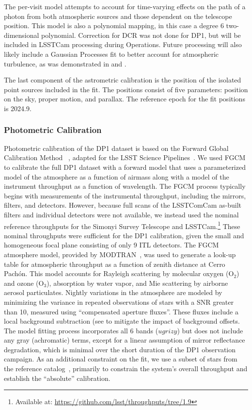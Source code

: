 The per-visit model attempts to account for time-varying effects on the path of a photon from both atmospheric sources and those dependent on the telescope position.
This model is also a polynomial mapping, in this case a degree 6 two-dimensional polynomial.
Correction for \gls{DCR} was not done for \gls{DP1}, but will be included in LSSTCam processing during Operations.
Future processing will also likely include a Gaussian Processes fit to better account for atmospheric turbulence, as was demonstrated in \citet{Fortino2021} and \citet{Leget2021}.

The last component of the astrometric \gls{calibration} is the position of the isolated point sources included in the fit.
The positions consist of five parameters: position on the sky, proper motion, and parallax.
The reference \gls{epoch} for the fit positions is 2024.9.

\subsubsection{Photometric Calibration}
\label{photometric_calibration}
Photometric \gls{calibration} of the DP1 dataset is based on the Forward Global Calibration Method
~\citep[FGCM][]{2018AJ....155...41B}, adapted for the LSST Science Pipelines~\citep{2022PASJ...74..247A, SITCOMTN-086}.
We used \gls{FGCM} to calibrate the full DP1 dataset with a forward model that uses a parameterized model of the atmosphere as a function of airmass along with a model of the instrument throughput as a function of wavelength.
The \gls{FGCM} process typically begins with measurements of the instrumental throughput, including the mirrors, filters, and detectors.
However, because full scans of the \gls{LSSTComCam} as-built filters and individual detectors were not available, we instead used the nominal reference throughputs for the Simonyi Survey Telescope and LSSTCam.\footnote{Available at: \url{https://github.com/lsst/throughputs/tree/1.9}}
These nominal throughputs were sufficient for the DP1 calibration, given the small and homogeneous focal plane consisting of only 9 \gls{ITL} detectors.
The FGCM atmosphere model, provided by MODTRAN~\citep{1999SPIE.3756..348B}, was used to generate a look-up table for atmospheric throughput as a function of zenith distance at Cerro Pachón.
This model accounts for Rayleigh scattering by molecular oxygen ($\mathrm{O}_2$) and ozone ($\mathrm{O}_3$), absorption by water vapor, and Mie scattering by airborne aerosol particulates.
Nightly variations in the atmosphere are modeled by minimizing the variance in repeated observations of stars with a \gls{SNR} greater than 10, measured using ``compensated aperture fluxes''.
These fluxes include a local \gls{background} subtraction (see  to mitigate the impact of \gls{background} offsets.
The model fitting process incorporates all 6 bands ($ugrizy$) but does not include any gray (achromatic) terms, except for a linear assumption of mirror reflectance degradation, which is minimal over the short duration of the \gls{DP1} observation campaign.
As an additional constraint on the fit, we use a subset of stars from the reference catalog~\citep{DMTN-277}, primarily to constrain the system's overall throughput and establish the ``absolute'' calibration.

